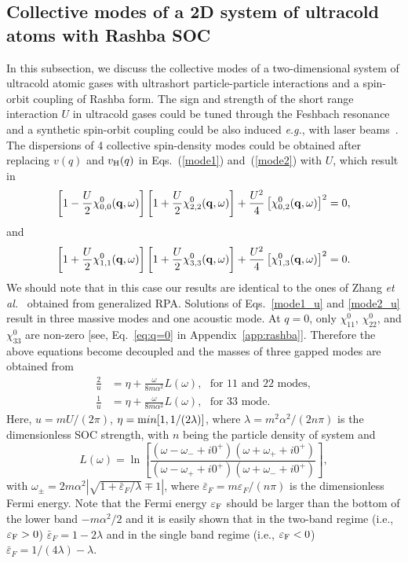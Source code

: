 \documentclass[aps, pra, reprint,superscriptaddress]{revtex4-1}
\def\be{\begin{equation}}
\def\ee{\end{equation}}
\def\qv{{\bf q}}
\begin{document}
\subsection{Collective modes of a 2D system of ultracold atoms with Rashba SOC}
In this subsection, we discuss the collective modes of a two-dimensional system of ultracold atomic gases with ultrashort particle-particle interactions and a spin-orbit coupling of Rashba form.
The sign and strength of the short range interaction $U$ in ultracold gases could be tuned through the Feshbach resonance~\cite{chin_rmp2010} and a synthetic spin-orbit coupling could be also induced \textit{e.g.}, with laser beams~\cite{dalibard_rmp2011,goldman_rpp2014}. The dispersions of 4 collective spin-density modes could be obtained after replacing $v(q)$ and $v_{\rm H}(q)$ in Eqs.~(\ref{mode1}) and~(\ref{mode2}) with $U$, which result in
\be\label{mode1_u} 
\left[1-\frac{U}{2}\chi^{0}_{0,0}(\qv,\omega)\right]\left[1+\frac{U}{2}\chi^{0}_{2,2}(\qv,\omega)\right]+\frac{U^2}{4}\left[\chi^{0}_{0,2}(\qv,\omega) \right]^2=0,
\ee
and
\be\label{mode2_u}
\left[1+\frac{U}{2}\chi^{0}_{1,1}(\qv,\omega)\right]\left[1+\frac{U}{2}\chi^{0}_{3,3}(\qv,\omega)\right]+\frac{U^2}{4}\left[\chi^{0}_{1,3}(\qv,\omega)\right]^2  =0.
\ee
We should note that in this case our results are identical to the ones of Zhang \textit{et al.}~\cite{Zhang_pra2013} obtained from generalized RPA. Solutions of Eqs.~\eqref{mode1_u} and \eqref{mode2_u} result in three massive modes and one acoustic mode. 
At $q=0$, only $\chi^0_{11}$, $\chi^0_{22}$, and $\chi^0_{33}$ are non-zero [see, Eq.~\eqref{eq:q=0} in Appendix~\ref{app:rashba}]. Therefore the above equations become decoupled and the masses of three gapped modes are obtained from
\be\label{eq:w11_33}
\begin{split}
\frac{2}{u}&=\eta+\frac{\omega}{8m \alpha^2}L(\omega), ~~~\textrm{for 11 and 22 modes},\\
\frac{1}{u}&=\eta+\frac{\omega}{8m \alpha^2}L(\omega), ~~~\textrm{for 33 mode}.
\end{split}
\ee
Here, $u=mU/(2\pi)$, $\eta= {\textrm min}[1,1/(2\lambda)]$,  where $\lambda=m^2\alpha^2/(2n\pi)$ is the dimensionless SOC strength, with $n$ being the particle density of system and
\be
L(\omega)=\ln\left[\frac{(\omega-\omega_{-}+i0^+)(\omega+\omega_{+}+i0^+)}{(\omega-\omega_{+}+i0^+)(\omega+\omega_{-}+i0^+)}\right],
\ee
with $\omega_{\pm}=2 m\alpha^2|\sqrt{1+\bar{\varepsilon}_{F}/\lambda}\mp 1|$, where $\bar{\varepsilon}_{F}=m\varepsilon_{F}/(n\pi)$ is the dimensionless Fermi energy.
Note that the Fermi energy $\varepsilon_{\rm F}$ should be larger than the bottom of the lower band $-m\alpha^2/2$ and it is easily shown that in the two-band regime (i.e., $\varepsilon_{\rm F}>0$) $\bar{\varepsilon}_{F}=1-2\lambda$ and in the single band regime (i.e., $\varepsilon_{\rm F}<0$) $\bar{\varepsilon}_{F}=1/(4\lambda)-\lambda$.
\end{document}
